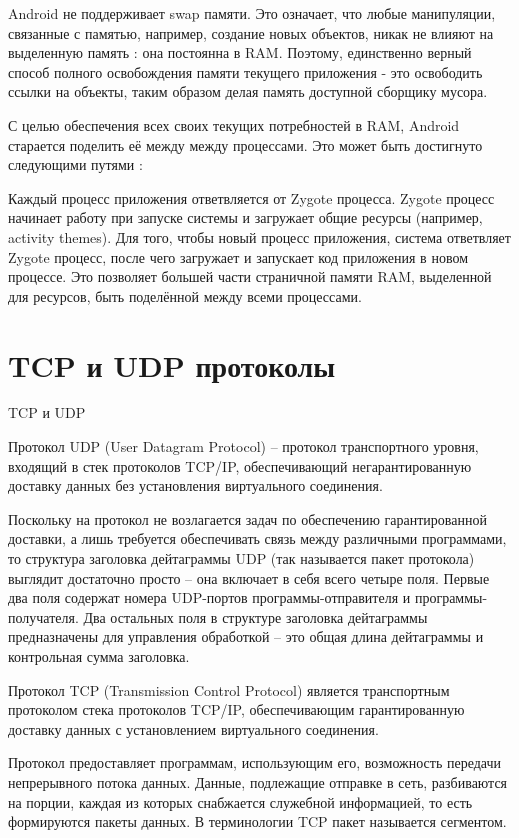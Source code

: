 Android не поддерживает swap памяти. Это означает, что любые манипуляции, связанные с памятью, например, создание новых объектов, никак не влияют на выделенную память : она постоянна в RAM. Поэтому, единственно верный способ полного освобождения памяти текущего приложения - это освободить ссылки на объекты, таким образом делая память доступной сборщику мусора. 

С целью обеспечения всех своих текущих потребностей в RAM, Android старается поделить её между между процессами. Это может быть достигнуто следующими путями :

Каждый процесс приложения ответвляется от Zygote процесса. Zygote процесс начинает работу при запуске системы и загружает общие ресурсы (например, activity themes). Для того, чтобы новый процесс приложения, система ответвляет Zygote процесс, после чего загружает и запускает код приложения в новом процессе. Это позволяет большей части страничной памяти RAM, выделенной для ресурсов, быть поделённой между всеми процессами.


\section{TCP и UDP протоколы}
TCP и UDP

Протокол UDP (User Datagram Protocol) – протокол транспортного уровня, входящий в стек протоколов TCP/IP, обеспечивающий негарантированную доставку данных без установления виртуального соединения.

Поскольку на протокол не возлагается задач по обеспечению гарантированной доставки, а лишь требуется обеспечивать связь между различными программами, то структура заголовка дейтаграммы UDP (так называется пакет протокола) выглядит достаточно просто – она включает в себя всего четыре поля. Первые два поля содержат номера UDP-портов программы-отправителя и программы-получателя. Два остальных поля в структуре заголовка дейтаграммы предназначены для управления обработкой – это общая длина дейтаграммы и контрольная сумма заголовка.

Протокол TCP (Transmission Control Protocol) является транспортным протоколом стека протоколов TCP/IP, обеспечивающим гарантированную доставку данных с установлением виртуального соединения. 

Протокол предоставляет программам, использующим его, возможность передачи непрерывного потока данных. Данные, подлежащие отправке в сеть, разбиваются на порции, каждая из которых снабжается служебной информацией, то есть формируются пакеты данных. В терминологии TCP пакет называется сегментом.

